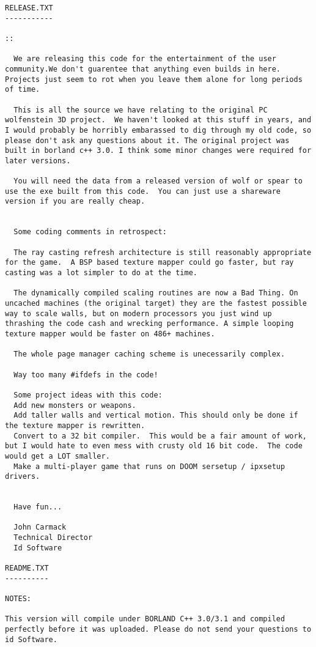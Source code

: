 
\begin{lstlisting}[breaklines=true,breakindent=0em]
RELEASE.TXT
-----------

::

  We are releasing this code for the entertainment of the user community.We don't guarentee that anything even builds in here. Projects just seem to rot when you leave them alone for long periods of time.

  This is all the source we have relating to the original PC wolfenstein 3D project.  We haven't looked at this stuff in years, and I would probably be horribly embarassed to dig through my old code, so please don't ask any questions about it. The original project was built in borland c++ 3.0. I think some minor changes were required for later versions.

  You will need the data from a released version of wolf or spear to use the exe built from this code.  You can just use a shareware version if you are really cheap.


  Some coding comments in retrospect:

  The ray casting refresh architecture is still reasonably appropriate for the game.  A BSP based texture mapper could go faster, but ray casting was a lot simpler to do at the time.

  The dynamically compiled scaling routines are now a Bad Thing. On uncached machines (the original target) they are the fastest possible way to scale walls, but on modern processors you just wind up thrashing the code cash and wrecking performance. A simple looping texture mapper would be faster on 486+ machines.

  The whole page manager caching scheme is unecessarily complex.

  Way too many #ifdefs in the code!

  Some project ideas with this code:
  Add new monsters or weapons.
  Add taller walls and vertical motion. This should only be done if the texture mapper is rewritten.
  Convert to a 32 bit compiler.  This would be a fair amount of work, but I would hate to even mess with crusty old 16 bit code.  The code would get a LOT smaller.
  Make a multi-player game that runs on DOOM sersetup / ipxsetup drivers.


  Have fun...

  John Carmack
  Technical Director
  Id Software

README.TXT
----------

NOTES:

This version will compile under BORLAND C++ 3.0/3.1 and compiled perfectly before it was uploaded. Please do not send your questions to id Software.

   \end{lstlisting}
